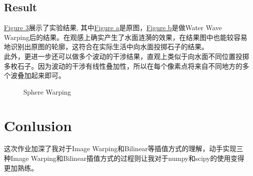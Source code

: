 \documentclass[UTF8]{ctexart}
\begin{document}
	\subsection*{Result}
	
	\hyperref[Fig.waterwave]{Figure 3}展示了实验结果, 其中\hyperref[Fig.sub.5]{Figure a}是原图，\hyperref[Fig.sub.6]{Figure b}是做Water Wave Warping后的结果。在观感上确实产生了水面涟漪的效果，在结果图中也能较容易地识别出原图的轮廓，这符合在实际生活中向水面投掷石子的结果。\\
	
	此外，更进一步还可以做多个波动的干涉结果，直观上类似于向水面不同位置投掷多枚石子。因为波动的干涉有线性叠加性，所以在每个像素点将来自不同地方的多个波叠加起来即可。
	\begin{figure}[htbp]
		\centering 
		\caption{Sphere Warping}
		\label{Fig.waterwave}
	\end{figure}

	\section*{Conlusion}
	这次作业加深了我对于Image Warping和Bilinear等插值方式的理解，动手实现三种Image Warping和Bilinear插值方式的过程则让我对于numpy和scipy的使用变得更加熟练。
	
\end{document}

